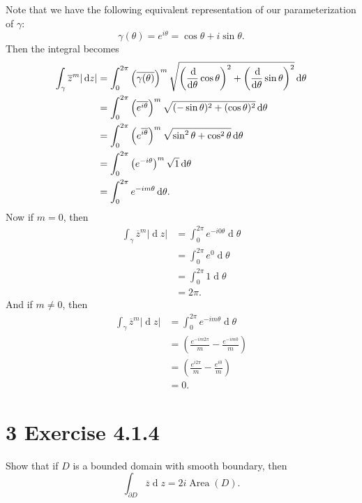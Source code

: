 \documentclass[12pt]{article}
\newenvironment{problem}
    {\begin{lrbox}{\mybox}\begin{minipage}{0.98\textwidth}}
    {\end{minipage}\end{lrbox}\framebox[\textwidth]{\usebox{\mybox}}}
\newcommand{\<}{\left\langle} %
\renewcommand{\>}{\right\rangle} %
\renewcommand{\d}[1]{\operatorname{d}\!#1} %
\newcommand{\od}[3][1]{\ifnum#1=1{\frac{\d #2}{\d #3}}\else{\frac{\d^{#1}#2}{\d #3^{#1}}}\fi} %
\let\conj\overline %
\begin{document}
Note that we have the following equivalent representation of our parameterization of $\gamma$:
\[\gamma(\theta) = e^{i\theta} = \cos\theta + i\sin\theta.\]
Then the integral becomes
\begin{align*}
    \int_\gamma\conj{z}^m|\d{z}|
        &= \int_0^{2\pi}\left(\conj{\gamma(\theta)}\right)^m\sqrt{\left(\od{}{\theta}\cos\theta\right)^2 + \left(\od{}{\theta}\sin\theta\right)^2}\d{\theta} \\
        &= \int_0^{2\pi}\left(\conj{e^{i\theta}}\right)^m\sqrt{(-\sin\theta)^2 + (\cos\theta)^2}\d{\theta} \\
        &= \int_0^{2\pi}\left(e^{\conj{i\theta}}\right)^m\sqrt{\sin^2\theta + \cos^2\theta}\d{\theta} \\
        &= \int_0^{2\pi}\left(e^{-i\theta}\right)^m\sqrt{1}\d{\theta} \\
        &= \int_0^{2\pi}e^{-im\theta}\d{\theta}.
\end{align*}
Now if $m=0$, then
\begin{align*}
    \int_\gamma\conj{z}^m|\d{z}|
        &= \int_0^{2\pi} e^{-i0\theta} \d{\theta} \\
        &= \int_0^{2\pi} e^0 \d{\theta} \\
        &= \int_0^{2\pi} 1 \d{\theta}\\
        &= 2\pi.
\end{align*}
And if $m\ne0$, then
\begin{align*}
    \int_\gamma\conj{z}^m|\d{z}|
        &= \int_0^{2\pi} e^{-im\theta} \d{\theta} \\
        &= \left(\frac{e^{-im2\pi}}{m} -  \frac{e^{-im0}}{m}\right)\\
        &= \left(\frac{e^{i2\pi}}{m} -  \frac{e^{i0}}{m}\right)\\
        &= 0.
\end{align*}


\newpage
\section*{3 Exercise 4.1.4}
\begin{problem}
    Show that if $D$ is a bounded domain with smooth boundary, then
    \[\int_{\partial D} \conj{z}\d{z} = 2i\operatorname{Area}(D).\]
\end{problem}
\end{document}

